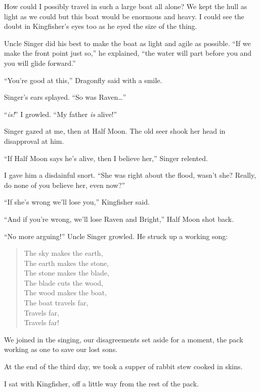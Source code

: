 How could I possibly travel in such a large boat all alone? We kept the hull as light as we could but this boat would be enormous and heavy. I could see the doubt in Kingfisher's eyes too as he eyed the size of the thing.

Uncle Singer did his best to make the boat as light and agile as possible. ``If we make the front point just so,'' he explained, ``the water will part before you and you will glide forward.''

``You're good at this,'' Dragonfly said with a smile.

Singer's ears splayed. ``So was Raven\ldots''

``\emph{is!}'' I growled. ``My father \emph{is} alive!''

Singer gazed at me, then at Half Moon. The old seer shook her head in disapproval at him.

``If Half Moon says he's alive, then I believe her,'' Singer relented.

I gave him a disdainful snort. ``She was right about the flood, wasn't she? Really, do none of you believe her, even now?''

``If she's wrong we'll lose you,'' Kingfisher said.

``And if you're wrong, we'll lose Raven and Bright,'' Half Moon shot back.

``No more arguing!'' Uncle Singer growled. He struck up a working song:
\vspace{-0.5em}

\begin{verse}
The sky makes the earth, \\
The earth makes the stone, \\
The stone makes the blade, \\
The blade cuts the wood, \\
The wood makes the boat, \\
The boat travels far, \\
Travels far, \\
Travels far!
\end{verse}

\vspace{-0.5em}
We joined in the singing, our disagreements set aside for a moment, the pack working as one to save our lost sons.

\secdiv

\noindent At the end of the third day, we took a supper of rabbit stew cooked in skins.

I sat with Kingfisher, off a little way from the rest of the pack.

